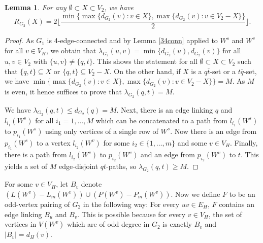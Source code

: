 \documentclass[a4paper,12pt,makeidx]{article}
\newtheorem{lemma}{Lemma}
\begin{document}
\begin{lemma}\label{r}
For any $\emptyset \subset X \subset V_2$, we have\\
\begin{equation*} R_{G_2}(X) =2\lfloor\frac{\min\{\max\{d_{G_2}(v):v \in X\},\max\{d_{G_2}(v):v \in V_2-X\}\}}{2}\rfloor.
\end{equation*}
\end{lemma}
\begin{proof}
As $G_1$ is 4-edge-connected and by Lemma \ref{34conn} applied to $W^s$ and $W^v$ for all $v \in V_H$, we obtain that $\lambda_{G_2}(u,v)= \min\{d_{G_2}(u),d_{G_2}(v)\}$ for all $u,v \in V_2$ with $\{u,v\} \neq \{q,t\}$. This shows the statement for all $\emptyset \subset X \subset V_2$ such that $\{q,t\}\subseteq X$ or $\{q,t\}\subseteq V_2-X$. On the other hand, if $X$ is a $q \bar{t}$-set or a $t\bar{q}$-set, we have $\min\{\max\{d_{G_2}(v):v \in X\},\max\{d_{G_2}(v):v \in V_2-X\}\}=M$. As $M$ is even, it hence suffices to prove that $\lambda_{G_2}(q,t)=M$. 

We have $\lambda_{G_2}(q,t)\leq d_{G_2}(q)=M$. Next, there is an edge linking $q$ and $l_{i_1}(W^s)$ for all $i_1=1,\ldots ,M$ which can be concatenated to a path from $l_{i_1}(W^s)$ to $p_{i_1}(W^s)$ using only vertices of a single row of $W^s$. Now there is an edge from $p_{i_1}(W^s)$ to a vertex $l_{i_2}(W^v)$ for some $i_2\in\{1,\ldots,m\}$ and some $v \in V_H$. Finally, there is a path from  $l_{i_2}(W^v)$ to  $p_{i_2}(W^v)$ and an edge from $p_{i_2}(W^v)$ to $t$. This yields a set of $M$ edge-disjoint $qt$-paths, so $\lambda_{G_2}(q,t)\geq M$.

\end{proof}
For some $v \in V_H$, let  $B_v$ denote $(L(W^{v})-L_{m}(W^{v}))\cup (P(W^{v})-P_{m}(W^{v}))$. Now we define $F$ to be an odd-vertex pairing of $G_2$ in the following way: For every $uv \in E_H$, $F$ contains an edge linking $B_u$ and $B_v$. This is possible because for every $v \in V_H$, the set of vertices in $V(W^v)$ which are of odd degree in $G_2$ is exactly $B_v$ and $|B_v|=d_H(v)$.
\end{document}
